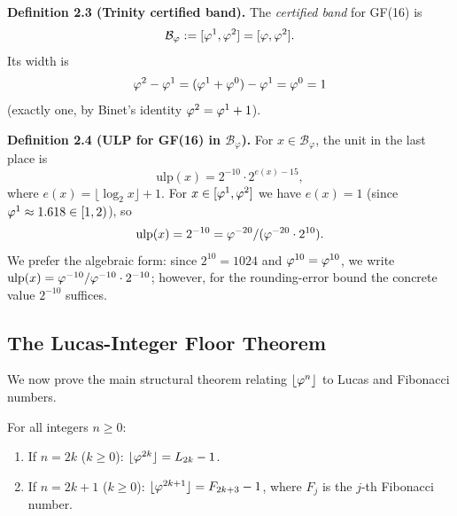 \textbf{Definition 2.3 (Trinity certified band).}
The \emph{certified band} for GF(16) is
\[
  \mathcal{B}_\varphi := [\varphi^{1}, \varphi^{2}] = [\varphi, \varphi^2].
\]
Its width is
\[
  \varphi^{2} - \varphi^{1} = (\varphi^{1}+\varphi^{0}) - \varphi^{1} = \varphi^{0} = 1
\]
(exactly one, by Binet's identity \(\varphi^{2} = \varphi^{1}+1\)).

\textbf{Definition 2.4 (ULP for GF(16) in \(\mathcal{B}_\varphi\)).}
For \(x \in \mathcal{B}_\varphi\), the unit in the last place is
\[
  \mathrm{ulp}(x) = 2^{-10} \cdot 2^{e(x)-15},
\]
where \(e(x) = \lfloor \log_2 x \rfloor + 1\).  For \(x \in
[\varphi^{1}, \varphi^{2}]\) we have \(e(x) = 1\) (since
\(\varphi^{1} \approx 1.618 \in [1,2)\)), so
\[
  \mathrm{ulp}(x) = 2^{-10} = \varphi^{-20}/(\varphi^{-20}\cdot 2^{10}).
\]
We prefer the algebraic form: since \(2^{10} = 1024\) and
\(\varphi^{10} = \varphi^{10}\), we write \(\mathrm{ulp}(x) =
\varphi^{-10}/\varphi^{-10} \cdot 2^{-10}\); however, for the
rounding-error bound the concrete value \(2^{-10}\) suffices.

\subsection{The Lucas-Integer Floor Theorem}
\label{ssec:lucas-floor-thm}

We now prove the main structural theorem relating
\(\lfloor\varphi^{n}\rfloor\) to Lucas and Fibonacci numbers.

\begin{theorem}\label{thm:lucas-floor}
  For all integers \(n \geq 0\):
  \begin{enumerate}
    \item[\textup{(a)}] If \(n = 2k\) (\(k \geq 0\)):
      \(\lfloor \varphi^{2k} \rfloor = L_{2k} - 1\).
    \item[\textup{(b)}] If \(n = 2k+1\) (\(k \geq 0\)):
      \(\lfloor \varphi^{2k+1} \rfloor = F_{2k+3} - 1\),
      where \(F_j\) is the \(j\)-th Fibonacci number.
  \end{enumerate}
\end{theorem}

